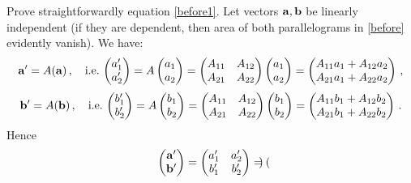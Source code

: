 \documentclass[12pt]{article}
\numberwithin{equation}{section}
\begin{document}
   \smallskip
{\footnotesize
    Prove  straightforwardly equation \eqref{before1}.
     Let vectors $\ac,\b$ be linearly independent
  (if they are dependent, then area of both parallelograms
  in \eqref{before} evidently vanish).
          We have:
         $$
  \ac'=A(\ac)\,,\quad {\rm i.e.\,}
       \begin{pmatrix}
          a'_1\cr
          a'_2\cr
       \end{pmatrix}
                =A
           \left(
       \begin{matrix}
          a_1\cr
          a_2\cr
       \end{matrix}
         \right)
              =
       \begin{pmatrix}
          A_{11} &A_{12}\cr
          A_{21} &A_{22}\cr
       \end{pmatrix}
       \begin{pmatrix}
          a_1\cr
          a_2\cr
       \end{pmatrix}
              =
       \begin{pmatrix}
          A_{11}a_1+A_{12}a_2\cr
          A_{21}a_1+A_{22}a_2\cr
       \end{pmatrix}
              \,,
        $$
           $$
  \b'=A(\b)\,,\quad {\rm i.e.\,}
       \begin{pmatrix}
          b'_1\cr
          b'_2\cr
       \end{pmatrix}
                =A
           \left(
       \begin{matrix}
          b_1\cr
          b_2\cr
       \end{matrix}
         \right)
              =
       \begin{pmatrix}
          A_{11} &A_{12}\cr
          A_{21} &A_{22}\cr
       \end{pmatrix}
       \begin{pmatrix}
          b_1\cr
          b_2\cr
       \end{pmatrix}
              =
       \begin{pmatrix}
          A_{11}b_1+A_{12}b_2\cr
          A_{21}b_1+A_{22}b_2\cr
       \end{pmatrix}
              \,.
        $$
  Hence
               $$
\begin{pmatrix}
    \ac'\cr
        \b'\cr
     \end{pmatrix}
     =
\begin{pmatrix}
    a'_1 &a'_2\cr
    b'_1 &b'_2\cr
     \end{pmatrix}=
        \begin{pmatrix}

\end{pmatrix}$$}
\end{document}

